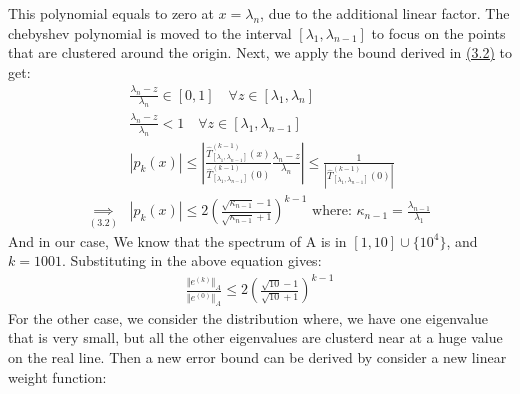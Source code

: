 \documentclass[]{article}
\begin{document}
    \par
    This polynomial equals to zero at $x = \lambda_n$, due to the additional linear factor. The chebyshev polynomial is moved to the interval $[\lambda_1, \lambda_{n -1}]$ to focus on the points that are clustered around the origin. Next, we apply the bound derived in \hyperref[eqn:3.2]{(3.2)} to get:
    \begin{align*}\tag{3.4}\label{eqn:3.4}
        &
        \frac{\lambda_n - z}{\lambda_n} \in [0, 1]
        \quad \forall z \in [\lambda_1, \lambda_n]
        \\
        &
        \frac{\lambda_n - z}{\lambda_n} <1
        \quad  \forall z \in 
        [\lambda_1, \lambda_{n-1}]
        \\
        & 
        |p_k(x)| \le
        \left|
            \frac{
                \hat{T}_{[\lambda_1, \lambda_{n-1}]}^{(k - 1)}(x)
            }{
                \hat{T}_{[\lambda_1, \lambda_{n - 1}]}^{(k - 1)}(0)
            }
            \frac{\lambda_n - z}{\lambda_n}
        \right|
        \le 
        \frac{1}{
        \left|
            \hat{T}_{[\lambda_1, \lambda_{n - 1}]}^{(k - 1)}(0)
        \right|}
        \\
        \underset{\hyperref[eqn:3.2]{(3.2)}}{\implies}
        & |p_k(x)|
        \le 
        2\left(
        \frac{\sqrt{\kappa_{n - 1}} - 1}{\sqrt{\kappa_{n - 1}} + 1}
        \right)^{k - 1} 
        \text{ where: }\kappa_{n - 1} = \frac{\lambda_{n - 1}}{\lambda_1}
    \end{align*}
    And in our case, We know that the spectrum of A is in $[1, 10]\cup\{10^4\}$, and $k = 1001$. Substituting in the above equation gives: 
    \begin{align*}\tag{3.5}\label{eqn:3.5}
        \frac{\Vert e^{(k)}\Vert_A}{\Vert e^{(0)}\Vert_A}
        \le
        2\left(
            \frac{\sqrt{10} - 1}{\sqrt{10} + 1}
        \right)^{k - 1}
    \end{align*}
    For the other case, we consider the distribution where, we have one eigenvalue that is very small, but all the other eigenvalues are clusterd near at a huge value on the real line. Then a new error bound can be derived by consider a new linear weight function: 
\end{document}
